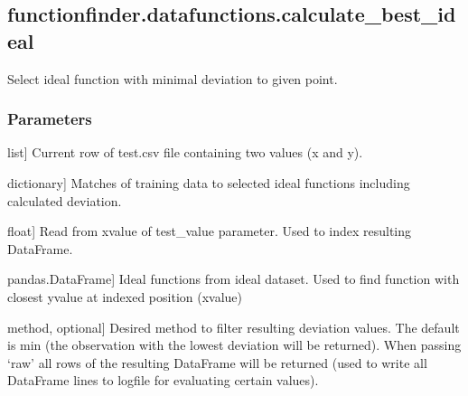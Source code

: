 \documentclass[letterpaper,10pt,english]{sphinxmanual}
\begin{document}
\sphinxstepscope


\subsection{functionfinder.datafunctions.calculate\_best\_ideal}
\label{\detokenize{_autosummary/functionfinder.datafunctions.calculate_best_ideal:functionfinder-datafunctions-calculate-best-ideal}}\label{\detokenize{_autosummary/functionfinder.datafunctions.calculate_best_ideal::doc}}

\begin{fulllineitems}
\label{\detokenize{_autosummary/functionfinder.datafunctions.calculate_best_ideal:functionfinder.datafunctions.calculate_best_ideal}}
\pysigstartsignatures
{}
\pysigstopsignatures
\sphinxAtStartPar
Select ideal function with minimal deviation to given point.


\subsubsection{Parameters}
\label{\detokenize{_autosummary/functionfinder.datafunctions.calculate_best_ideal:parameters}}\begin{description}
\sphinxlineitem{test\_value}{[}list{]}
\sphinxAtStartPar
Current row of test.csv file containing two values (x and y).

\sphinxlineitem{match\_against}{[}dictionary{]}
\sphinxAtStartPar
Matches of training data to selected ideal functions including
calculated deviation.

\sphinxlineitem{index}{[}float{]}
\sphinxAtStartPar
Read from x\sphinxhyphen{}value of test\_value parameter. Used to index resulting
DataFrame.

\sphinxlineitem{idealdata}{[}pandas.DataFrame{]}
\sphinxAtStartPar
Ideal functions from ideal dataset. Used to find function with closest
y\sphinxhyphen{}value at indexed position (x\sphinxhyphen{}value)

\sphinxlineitem{function}{[}method, optional{]}
\sphinxAtStartPar
Desired method to filter resulting deviation values.
The default is min (the observation with the lowest deviation will be
returned). When passing ‘raw’ all rows of the resulting DataFrame will
be returned (used to write all DataFrame lines to logfile for
evaluating certain values).


\end{description}
\end{fulllineitems}
\end{document}
